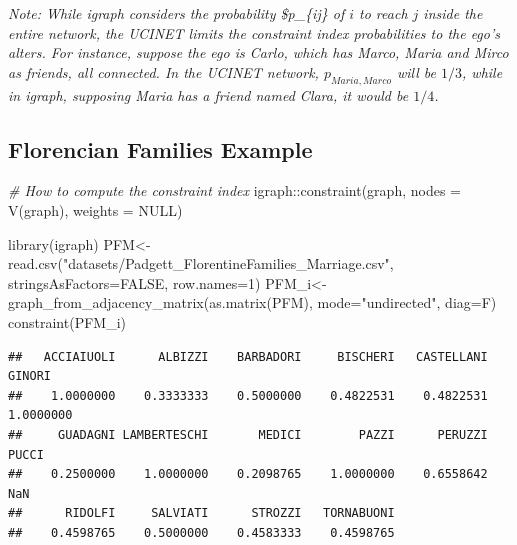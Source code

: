 \documentclass[
  notitlepage,
  onecolumn,
  openany]{book}
\newenvironment{Shaded}{\begin{snugshade}}{\end{snugshade}}
\newcommand{\AttributeTok}[1]{\textcolor[rgb]{0.77,0.63,0.00}{#1}}
\newcommand{\CommentTok}[1]{\textcolor[rgb]{0.56,0.35,0.01}{\textit{#1}}}
\newcommand{\ConstantTok}[1]{\textcolor[rgb]{0.00,0.00,0.00}{#1}}
\newcommand{\DecValTok}[1]{\textcolor[rgb]{0.00,0.00,0.81}{#1}}
\newcommand{\FunctionTok}[1]{\textcolor[rgb]{0.00,0.00,0.00}{#1}}
\newcommand{\NormalTok}[1]{#1}
\newcommand{\OtherTok}[1]{\textcolor[rgb]{0.56,0.35,0.01}{#1}}
\newcommand{\SpecialCharTok}[1]{\textcolor[rgb]{0.00,0.00,0.00}{#1}}
\newcommand{\StringTok}[1]{\textcolor[rgb]{0.31,0.60,0.02}{#1}}
\begin{document}
\emph{Note: While igraph considers the probability \$p\_\{ij\} of \(i\) to reach \(j\) inside the entire network, the UCINET limits the constraint index probabilities to the ego's alters. For instance, suppose the ego is Carlo, which has Marco, Maria and Mirco as friends, all connected. In the UCINET network, \(p_{Maria, Marco}\) will be \(1/3\), while in igraph, supposing Maria has a friend named Clara, it would be \(1/4\).}

\hypertarget{florencian-families-example}{%
\subsection{Florencian Families Example}\label{florencian-families-example}}

\begin{Shaded}
\begin{Highlighting}[]
\CommentTok{\# How to compute the constraint index}
\NormalTok{igraph}\SpecialCharTok{::}\FunctionTok{constraint}\NormalTok{(graph, }\AttributeTok{nodes =} \FunctionTok{V}\NormalTok{(graph), }\AttributeTok{weights =} \ConstantTok{NULL}\NormalTok{)}
\end{Highlighting}
\end{Shaded}

\begin{Shaded}
\begin{Highlighting}[]
\FunctionTok{library}\NormalTok{(igraph)}
\NormalTok{PFM}\OtherTok{\textless{}{-}}\FunctionTok{read.csv}\NormalTok{(}\StringTok{"datasets/Padgett\_FlorentineFamilies\_Marriage.csv"}\NormalTok{,}
                            \AttributeTok{stringsAsFactors=}\ConstantTok{FALSE}\NormalTok{,}
                            \AttributeTok{row.names=}\DecValTok{1}\NormalTok{)}
\NormalTok{PFM\_i}\OtherTok{\textless{}{-}}\FunctionTok{graph\_from\_adjacency\_matrix}\NormalTok{(}\FunctionTok{as.matrix}\NormalTok{(PFM),}
                                   \AttributeTok{mode=}\StringTok{"undirected"}\NormalTok{,}
                                   \AttributeTok{diag=}\NormalTok{F)}
\FunctionTok{constraint}\NormalTok{(PFM\_i)}
\end{Highlighting}
\end{Shaded}

\begin{verbatim}
##   ACCIAIUOLI      ALBIZZI    BARBADORI     BISCHERI   CASTELLANI       GINORI 
##    1.0000000    0.3333333    0.5000000    0.4822531    0.4822531    1.0000000 
##     GUADAGNI LAMBERTESCHI       MEDICI        PAZZI      PERUZZI        PUCCI 
##    0.2500000    1.0000000    0.2098765    1.0000000    0.6558642          NaN 
##      RIDOLFI     SALVIATI      STROZZI   TORNABUONI 
##    0.4598765    0.5000000    0.4583333    0.4598765
\end{verbatim}
\end{document}
